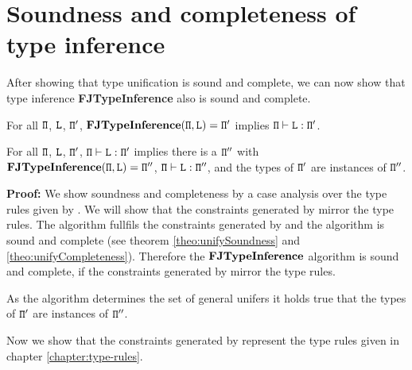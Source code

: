 \section{Soundness and completeness of type inference}
\label{sec:soundn-compl-type}

After showing that type unification is sound and complete, we
can now show that type inference \textbf{FJTypeInference} also is
sound and complete.
\begin{theorem}[Soundness] For all ${\tt \Pi}$, ${\tt L}$, ${\tt \Pi'}$, 
  $\textbf{FJTypeInference}({\tt \Pi},\texttt{L}) = {\tt \Pi}'$ implies ${\tt \Pi} \vdash \texttt{L} : {\tt \Pi}'$.
\end{theorem}
\begin{theorem}[Completeness]  For all ${\tt \Pi}$, ${\tt L}$, ${\tt \Pi'}$,
  ${\tt \Pi} \vdash \texttt{L} : {\tt \Pi}'$ implies there is a
    ${\tt \Pi}''$ with $\textbf{FJTypeInference}({\tt \Pi},\texttt{L}) = {\tt \Pi}''$,
  ${\tt \Pi} \vdash \texttt{L} : {\tt \Pi}''$, and the types of ${\tt \Pi}'$ are
  instances of ${\tt \Pi}''$.
\end{theorem}
\textbf{Proof:}
We show soundness and completeness by a case analysis over the type rules given by \TFGJ{}.
We will show that the constraints generated by \fjtype{} mirror
the \TFGJ{} type rules.
The \unify{} algorithm fullfils the constraints generated by \fjtype{} and
the \unify{} algorithm is sound and complete (see theorem \ref{theo:unifySoundness} and \ref{theo:unifyCompleteness}).
Therefore the $\textbf{FJTypeInference}$ algorithm is sound and
complete, if the constraints generated by \fjtype{} mirror
the \TFGJ{} type rules.

As the \unify{} algorithm determines the set of general unifers it
  holds true that the types of ${\tt \Pi}'$ are
  instances of ${\tt \Pi}''$.

Now we show that the constraints generated by {\fjtype{}}
represent the type rules given in chapter \ref{chapter:type-rules}.



